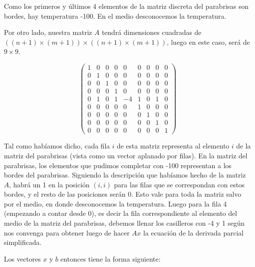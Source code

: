 \vspace{\baselineskip}

Como los primeros y últimos 4 elementos de la matriz discreta del parabrisas son bordes, hay temperatura -100. En el medio desconocemos la temperatura.

Por otro lado, nuestra matriz $A$ tendrá dimensiones cuadradas de $((n+1) \times (m+1)) \times  ((n+1) \times (m+1))$, luego en este caso, será de $9 \times 9$.

\vspace{\baselineskip}

\[ \left( \begin{array}{ccccccccc}
1 & 0 & 0 & 0 & 0 & 0 & 0 & 0 & 0 \\
0 & 1 & 0 & 0 & 0 & 0 & 0 & 0 & 0 \\
0 & 0 & 1 & 0 & 0 & 0 & 0 & 0 & 0 \\ 
0 & 0 & 0 & 1 & 0 & 0 & 0 & 0 & 0 \\
0 & 1 & 0 & 1 & -4 & 1 & 0 & 1 & 0 \\
0 & 0 & 0 & 0 & 0 & 1 & 0 & 0 & 0 \\ 
0 & 0 & 0 & 0 & 0 & 0 & 1 & 0 & 0 \\
0 & 0 & 0 & 0 & 0 & 0 & 0 & 1 & 0 \\
0 & 0 & 0 & 0 & 0 & 0 & 0 & 0 & 1
\end{array} \right)\] 

\vspace{\baselineskip}

Tal como habíamos dicho, cada fila $i$ de esta matriz representa al elemento $i$ de la matriz del parabrisas (vista como un vector aplanado por filas). En la matriz del parabrisas, los elementos que pudimos completar con -100 representan a los bordes del parabrisas. Siguiendo la descripción que habíamos hecho de la matriz $A$, habrá un 1 en la posición $(i,i)$ para las filas que se correspondan con estos bordes, y el resto de las posiciones serán 0. Esto vale para toda la matriz salvo por el medio, en donde desconocemos la temperatura. Luego para la fila $4$ (empezando a contar desde 0), es decir la fila correspondiente al elemento del medio de la matriz del parabrisas, debemos llenar los casilleros con -4 y 1 según nos convenga para obtener luego de hacer $Ax$ la ecuación de la derivada parcial simplificada.

Los vectores $x$ y $b$ entonces tiene la forma siguiente:

